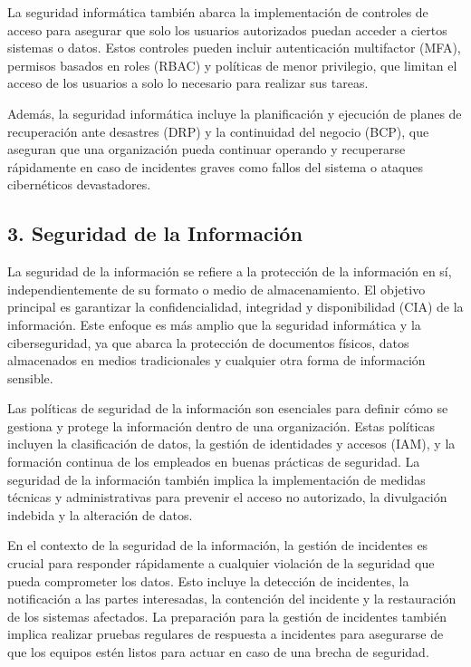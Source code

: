 \documentclass[12pt]{article}
\begin{document}
La seguridad informática también abarca la implementación de controles de acceso para asegurar que solo los usuarios autorizados puedan acceder a ciertos sistemas o datos. Estos controles pueden incluir autenticación multifactor (MFA), permisos basados en roles (RBAC) y políticas de menor privilegio, que limitan el acceso de los usuarios a solo lo necesario para realizar sus tareas.

Además, la seguridad informática incluye la planificación y ejecución de planes de recuperación ante desastres (DRP) y la continuidad del negocio (BCP), que aseguran que una organización pueda continuar operando y recuperarse rápidamente en caso de incidentes graves como fallos del sistema o ataques cibernéticos devastadores.

\subsection*{3. Seguridad de la Información}
La seguridad de la información se refiere a la protección de la información en sí, independientemente de su formato o medio de almacenamiento. El objetivo principal es garantizar la confidencialidad, integridad y disponibilidad (CIA) de la información. Este enfoque es más amplio que la seguridad informática y la ciberseguridad, ya que abarca la protección de documentos físicos, datos almacenados en medios tradicionales y cualquier otra forma de información sensible.

Las políticas de seguridad de la información son esenciales para definir cómo se gestiona y protege la información dentro de una organización. Estas políticas incluyen la clasificación de datos, la gestión de identidades y accesos (IAM), y la formación continua de los empleados en buenas prácticas de seguridad. La seguridad de la información también implica la implementación de medidas técnicas y administrativas para prevenir el acceso no autorizado, la divulgación indebida y la alteración de datos.

En el contexto de la seguridad de la información, la gestión de incidentes es crucial para responder rápidamente a cualquier violación de la seguridad que pueda comprometer los datos. Esto incluye la detección de incidentes, la notificación a las partes interesadas, la contención del incidente y la restauración de los sistemas afectados. La preparación para la gestión de incidentes también implica realizar pruebas regulares de respuesta a incidentes para asegurarse de que los equipos estén listos para actuar en caso de una brecha de seguridad.
\end{document}
